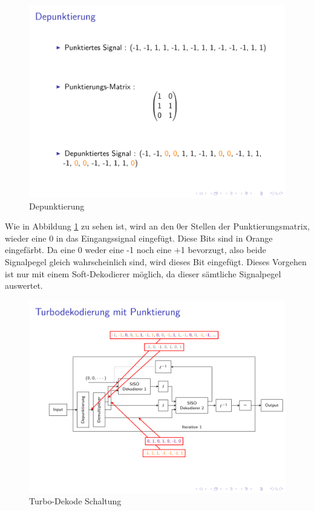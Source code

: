 \begin{figure}[!ht]
\centering
\includegraphics[width=\ScaleIfNeeded]{pictures/TurboDecodePunctured1}
\caption{Depunktierung}
\label{pic:TurboDecodeDepuncturing}
\end{figure}

Wie in Abbildung \ref{pic:TurboDecodeDepuncturing} zu sehen ist, wird an den 0er Stellen der Punktierungsmatrix, wieder eine 0 in das Eingangssignal eingefügt. Diese Bits sind in Orange eingefärbt. Da eine 0 weder eine -1 noch eine +1 bevorzugt, also beide Signalpegel gleich wahrscheinlich sind, wird dieses Bit eingefügt. Dieses Vorgehen ist nur mit einem Soft-Dekodierer möglich, da dieser sämtliche Signalpegel auswertet. 

\begin{figure}[!ht]
\centering
\includegraphics[width=\ScaleIfNeeded]{pictures/TurboDecodePunctured2}
\caption{Turbo-Dekode Schaltung}
\label{pic:TurboDecode}
\end{figure}

